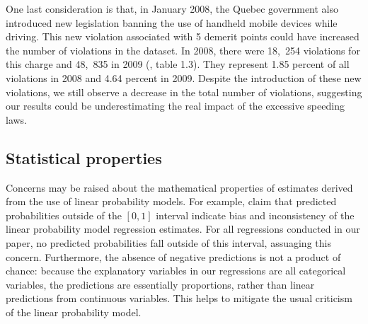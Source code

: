 One last consideration is that, in January 2008, 
the Quebec government also introduced new legislation 
banning the use of handheld mobile devices while driving. 
This new violation associated with 5 demerit points could have 
increased the number of violations in the dataset. 
In 2008, there were 18,~254 violations for this charge and 48,~835 in 2009 
% 
(\citet{SAAQ2010}, table 1.3).
% 
They represent 1.85 percent of all violations in 2008 and 4.64 percent in 2009. 
Despite the introduction of these new violations, 
we still observe a decrease in the total number of violations, 
suggesting our results could be underestimating the real impact of the excessive speeding laws.



\subsection{Statistical properties}

% 

Concerns may be raised about the mathematical properties of estimates 
derived from the use of linear probability models. 
For example, 
\citet{horraceoaxaca2006}
claim that predicted probabilities outside of the $[0,1]$ interval 
indicate bias and inconsistency of the linear probability model regression estimates. 
For all regressions conducted in our paper, 
no predicted probabilities fall outside of this interval, 
assuaging this concern. 
Furthermore, the absence of negative predictions is not a product of chance: 
because the explanatory variables in our regressions are all categorical variables, 
the predictions are essentially proportions, 
rather than linear predictions from continuous variables. 
This helps to mitigate the usual criticism of the linear probability model. 

